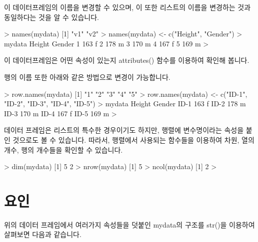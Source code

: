 \documentclass[tutorial.tex]{subfiles}
\begin{document}
이 데이터프레임의 이름을 변경할 수 있으며, 이 또한 리스트의 이름을 변경하는 것과 동일하다는 것을 알 수 있습니다.

\begin{Schunk}
\begin{Soutput}
> names(mydata)
[1] "v1" "v2"
> names(mydata) <- c("Height", "Gender")
> mydata
  Height Gender
1    163      f
2    178      m
3    170      m
4    167      f
5    169      m
> 	
\end{Soutput}
\end{Schunk}

이 데이터프레임은 어떤 속성이 있는지 attributes() 함수를 이용하여 확인해 봅니다. 
\begin{Schunk}
\end{Schunk}


행의 이름 또한 아래와 같은 방법으로 변경이 가능합니다. 

\begin{Schunk}
\begin{Soutput}
> row.names(mydata)
[1] "1" "2" "3" "4" "5"
> row.names(mydata) <- c("ID-1", "ID-2", "ID-3", "ID-4", "ID-5")
> mydata
     Height Gender
ID-1    163      f
ID-2    178      m
ID-3    170      m
ID-4    167      f
ID-5    169      m
>
\end{Soutput}
\end{Schunk}

데이터 프레임은 리스트의 특수한 경우이기도 하지만, 행렬에 변수명이라는 속성을 붙인 것으로도 볼 수 있습니다.
따라서, 행렬에서 사용되는 함수들을 이용하여 차원, 열의 개수, 행의 개수들을 확인할 수 있습니다.

\begin{Schunk}
\begin{Soutput}
> dim(mydata)
[1] 5 2
> nrow(mydata)
[1] 5
> ncol(mydata)
[1] 2
> 
\end{Soutput}
\end{Schunk}


\section{요인}

위의 데이터 프레임에서 여러가지 속성들을 덧붙인 mydata의 구조를 str()을 이용하여 살펴보면 다음과 같습니다.
\end{document}
